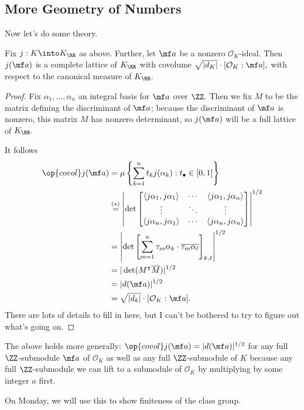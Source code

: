 \documentclass[../notes.tex]{subfiles}
\begin{document}
\subsection{More Geometry of Numbers}
Now let's do some theory.
\begin{proposition}
    Fix $j:K\into K_\RR$ as above. Further, let $\mf a$ be a nonzero $\mathcal O_K$-ideal. Then $j(\mf a)$ is a complete lattice of $K_\RR$ with covolume $\sqrt{|d_K|}\cdot[\mathcal O_K:\mf a],$ with respect to the canonical measure of $K_\RR.$
\end{proposition}
\begin{proof}
    Fix $\alpha_1,\ldots,\alpha_n$ an integral basis for $\mf a$ over $\ZZ.$ Then we fix $M$ to be the matrix defining the discriminant of $\mf a$; because the discriminant of $\mf a$ is nonzero, this matrix $M$ has nonzero determinant, so $j(\mf a)$ will be a full lattice of $K_\RR.$

    It follows
    \begin{align*}
        \op{covol}j(\mf a) &= \mu\left\{\sum_{k=1}^n t_k j(\alpha_k):t_\bullet\in[0,1]\right\} \\
        &\stackrel{(*)}=\left|\det\begin{bmatrix}
            \langle j\alpha_1,j\alpha_1\rangle & \cdots & \langle j\alpha_1,j\alpha_n\rangle \\
            \vdots & \ddots & \vdots \\
            \langle j\alpha_n,j\alpha_1\rangle & \cdots & \langle j\alpha_n,j\alpha_n\rangle
        \end{bmatrix}\right|^{1/2} \\
        &= \left|\det\left[\sum_{m=1}^n\tau_m\alpha_k\cdot\overline{\tau_m\alpha_\ell}\right]_{k,\ell}\right|^{1/2} \\
        &= |\det(M^\intercal \overline M)|^{1/2} \\
        &= |d(\mf a)|^{1/2} \\
        &= \sqrt{|d_k|}\cdot[\mathcal O_K:\mf a].
    \end{align*}
    There are lots of details to fill in here, but I can't be bothered to try to figure out what's going on.
\end{proof}
\begin{remark}
    The above holds more generally: $\op{covol}j(\mf a)=|d(\mf a)|^{1/2}$ for any full $\ZZ$-submodule $\mf a$ of $\mathcal O_K$ as well as any full $\ZZ$-submodule of $K$ because any full $\ZZ$-submodule we can lift to a submodule of $\mathcal O_K$ by multiplying by some integer $a$ first.
\end{remark}
On Monday, we will use this to show finiteness of the class group.
\end{document}
